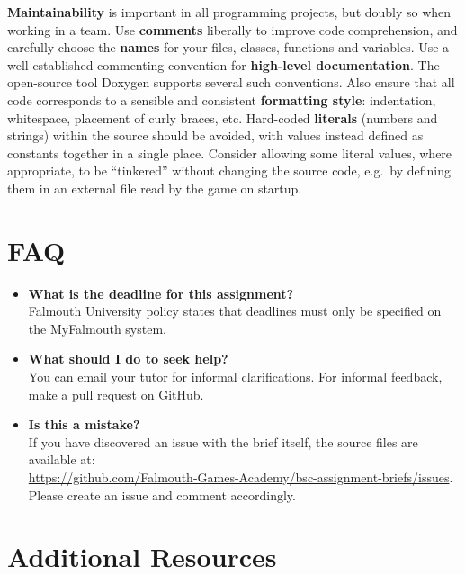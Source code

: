 \documentclass{../../fal_assignment}
\begin{document}
\textbf{Maintainability} is important in all programming projects,
but doubly so when working in a team.
Use \textbf{comments} liberally to improve code comprehension,
and carefully choose the \textbf{names} for your files, classes, functions and variables.
Use a well-established commenting convention
for \textbf{high-level documentation}.
The open-source tool Doxygen supports several such conventions.
Also ensure that all code corresponds to a sensible and consistent \textbf{formatting style}:
indentation, whitespace, placement of curly braces, etc.
Hard-coded \textbf{literals} (numbers and strings) within the source should be avoided,
with values instead defined as constants together in a single place.
Consider allowing some literal values, where appropriate, to be ``tinkered'' without changing the source code,
e.g.\ by defining them in an external file read by the game on startup.

\clearpage

\section*{FAQ}

\begin{itemize}
	\item 	\textbf{What is the deadline for this assignment?} \\ 
    		Falmouth University policy states that deadlines must only be specified on the MyFalmouth system.
    		
	\item 	\textbf{What should I do to seek help?} \\ 
    		You can email your tutor for informal clarifications. For informal feedback, make a pull request on GitHub. 
    		
    	\item 	\textbf{Is this a mistake?} \\ 	
    		If you have discovered an issue with the brief itself, the source files are available at: \\
    		\url{https://github.com/Falmouth-Games-Academy/bsc-assignment-briefs/issues}.\\
    		 Please create an issue and comment accordingly.
\end{itemize}

\section*{Additional Resources}
\end{document}
